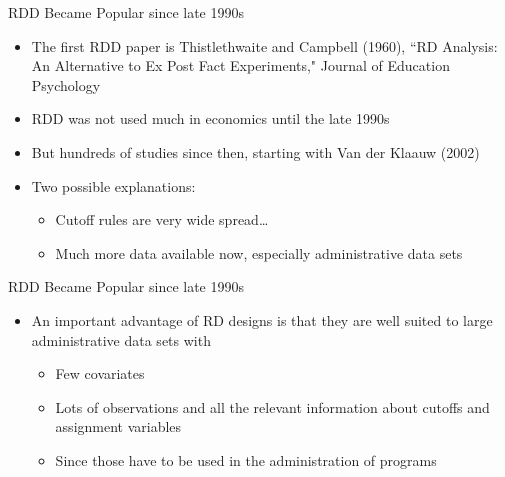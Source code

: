 \documentclass[hyperref={pdfpagelabels=false}]{beamer}
\begin{document}
\begin{frame}{RDD Became Popular since late 1990s }{}
	
	\begin{itemize}
		\item The first RDD paper is Thistlethwaite and Campbell (1960), ``RD Analysis: An Alternative to Ex Post Fact
		Experiments," Journal of Education Psychology
		\vspace{0.2cm}
		\item RDD was not used much in economics until the late 1990s
		\vspace{0.2cm}
		\item But hundreds of studies since then, starting with Van der Klaauw (2002)
		\vspace{0.2cm}
		\item Two possible explanations:
		\vspace{0.2cm}
		\begin{itemize}
			\item Cutoff rules are very wide spread…
			\vspace{0.2cm}
			\item Much more data available now, especially administrative data sets
		\end{itemize}
		
	\end{itemize}
\end{frame}


\begin{frame}{RDD Became Popular since late 1990s }{}
	
	\begin{itemize}
		\item An important advantage of RD designs is that they are well suited to
		large administrative data sets with
		\vspace{0.2cm}
		\begin{itemize}
			\item Few covariates
			\vspace{0.2cm}
			\item Lots of observations and all the relevant information about cutoffs and assignment variables 
			\vspace{0.2cm}
			\item Since those have to be used in the administration of programs
		\end{itemize}
		
		
	\end{itemize}
\end{frame}
\end{document}

